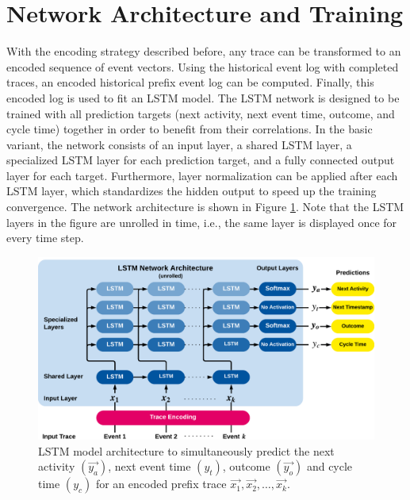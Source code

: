 \section{Network Architecture and Training}
With the encoding strategy described before, any trace can be transformed to an encoded sequence of event vectors.
Using the historical event log with completed traces, an encoded historical prefix event log can be computed. 
Finally, this encoded log is used to fit an LSTM model.
The LSTM network is designed to be trained with all prediction targets (next activity, next event time, outcome, and cycle time) together in order to benefit from their correlations.
In the basic variant, the network consists of an input layer, a shared LSTM layer, a specialized LSTM layer for each prediction target, and a fully connected output layer for each target.
Furthermore, layer normalization \cite{DBLP:journals/corr/BaKH16} can be applied after each LSTM layer, which standardizes the hidden output to speed up the training convergence.
The network architecture is shown in Figure \ref{fig:network}.
Note that the LSTM layers in the figure are unrolled in time, i.e., the same layer is displayed once for every time step.

\begin{figure}[!htbp]
	\centering
	\includegraphics[width=\textwidth]{figures/network}
	\caption[LSTM model architecture for text-aware process prediction]{LSTM model architecture to simultaneously predict the next activity $(\vec{y_a})$, next event time $(y_t)$, outcome $(\vec{y_o})$ and cycle time $(y_c)$ for an encoded prefix trace $\vec{x_1}, \vec{x_2}, \dots, \vec{x_k}$.}
	\label{fig:network}
\end{figure}

